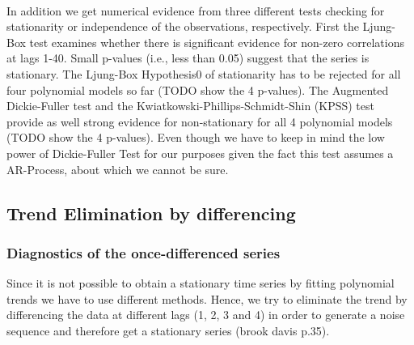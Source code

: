\documentclass[11pt,a4paper]{article}
\begin{document}
\\In addition we get numerical evidence from three different tests checking for stationarity or independence of the observations, respectively. First the Ljung-Box test examines whether there is significant evidence for non-zero correlations at lags 1-40. Small p-values (i.e., less than 0.05) suggest that the series is stationary. The Ljung-Box Hypothesis0 of stationarity has to be rejected for all four polynomial models so far (TODO show the 4 p-values). The Augmented Dickie-Fuller test and the Kwiatkowski-Phillips-Schmidt-Shin (KPSS) test provide as well strong evidence for non-stationary for all 4 polynomial models (TODO show the 4 p-values). Even though we have to keep in mind the low power of Dickie-Fuller Test for our purposes given the fact this test assumes a AR-Process, about which we cannot be sure.

\subsection{Trend Elimination by differencing}

\subsubsection{Diagnostics of the once-differenced series}
Since it is not possible to obtain a stationary time series by fitting polynomial trends we have to use different methods. Hence, we try to eliminate the trend by differencing the data at different lags (1, 2, 3 and 4) in order to generate a noise sequence and therefore get a stationary series (brook davis p.35). 
\end{document}
